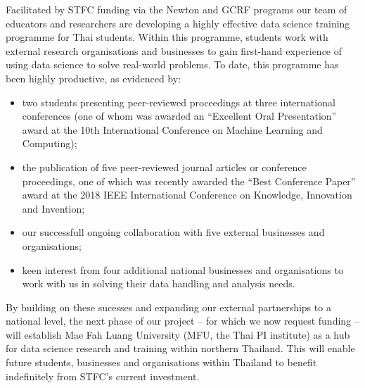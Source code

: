 \documentclass[11pt]{article}
\begin{document}
  \vspace{2mm}
  \noindent
  Facilitated by STFC funding via the Newton and GCRF programs our team of educators and researchers are developing a highly effective data science training programme for Thai students. Within this programme, students work with external research organisations and businesses to gain first-hand experience of using data science to solve real-world problems. To date, this programme has been highly productive, as evidenced by:
  \begin{itemize}[leftmargin=6mm,itemsep=-3pt,topsep=1pt]
    \item two students presenting peer-reviewed proceedings at three international conferences (one of whom was awarded an ``Excellent Oral Presentation'' award at the 10th International Conference on Machine Learning and Computing);
    \item the publication of five peer-reviewed journal articles or conference proceedings, one of which was recently awarded the ``Best Conference Paper'' award at the 2018 IEEE International Conference on Knowledge, Innovation and Invention;
    \item our successfull ongoing collaboration with five external businesses and organisations;
    \item keen interest from four additional national businesses and organisations to work with us in solving their data handling and analysis needs.
  \end{itemize}
  By building on these sucesses and expanding our external partnerships to a national level, the next phase of our project -- for which we now request funding -- will establish Mae Fah Luang University (MFU, the Thai PI institute) as a hub for data science research and training within northern Thailand. This will enable future students, businesses and organisations within Thailand to benefit indefinitely from STFC's current investment.
  
\end{document}
